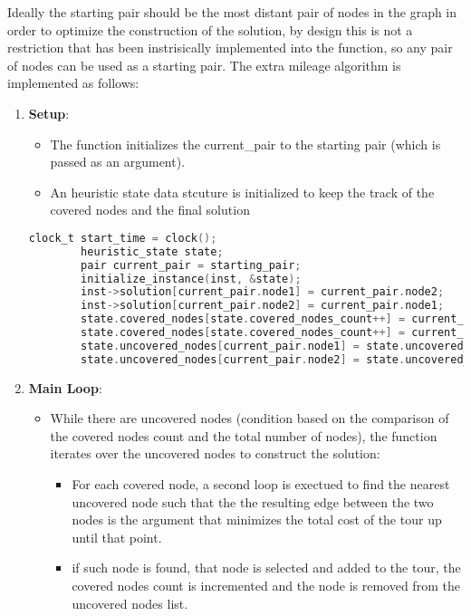 \documentclass{article}
\begin{document}
Ideally the starting pair should be the most distant pair of nodes in the graph in order to optimize the construction of the solution,
by design this is not a restriction that has been instrisically implemented into the function, so any pair of nodes can be used as a starting pair.
The extra mileage algorithm is implemented as follows:
\begin{enumerate} 
	\item \textbf{Setup}:
	\begin{itemize}
		\item The function initializes the current\_pair to the starting pair (which is passed as an argument).
		\item An heuristic state data stcuture is initialized to keep the track of the covered nodes and the final solution 
	\end{itemize}
	\begin{lstlisting}[language=C]
		clock_t start_time = clock();
		heuristic_state state;
		pair current_pair = starting_pair;
		initialize_instance(inst, &state);
		inst->solution[current_pair.node1] = current_pair.node2;
		inst->solution[current_pair.node2] = current_pair.node1;
		state.covered_nodes[state.covered_nodes_count++] = current_pair.node1;
		state.covered_nodes[state.covered_nodes_count++] = current_pair.node2;
		state.uncovered_nodes[current_pair.node1] = state.uncovered_nodes[--state.uncovered_nodes_count];
		state.uncovered_nodes[current_pair.node2] = state.uncovered_nodes[--state.uncovered_nodes_count];
	\end{lstlisting}
	\item \textbf{Main Loop}:
	      \begin{itemize}
		      \item While there are uncovered nodes (condition based on the comparison of the covered nodes count and the total number of nodes), 
			  the function iterates over the uncovered nodes to construct the solution:
		            \begin{itemize}
			            \item For each covered node, a second loop is exectued to find the nearest uncovered node such that 
			            the the resulting edge between the two nodes is the argument that minimizes the total cost of the tour up until that point.
			            \item if such node is found, that node is selected and added to the tour, 
						the covered nodes count is incremented and the node is removed from the uncovered nodes list.
		            \end{itemize}

\end{itemize}
\end{enumerate}
\end{document}
